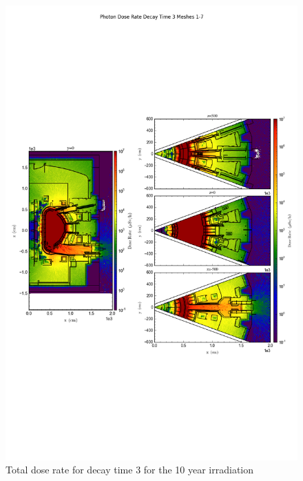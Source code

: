 \documentclass[12pt]{article}
\begin{document}
\clearpage
\begin{figure}[ht!]
\centering
\includegraphics[trim={0cm 8cm, 0cm 8cm},clip,scale=0.75]{../plots/final_model_with_b4c/10year/Photon_Dose_Rate_Decay_Time_3_Meshes_1-7.png}
\caption{Total dose rate for decay time 3 for the 10 year irradiation}
\label{fig:photons_10y_dc2_nob4c_dose}
\end{figure}
\end{document}
